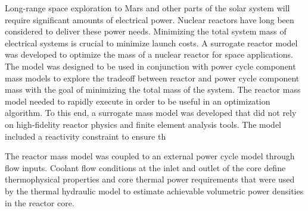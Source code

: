 Long-range space exploration to Mars and other parts of the solar system will
require significant amounts of electrical power. Nuclear reactors have long been
considered to deliver these power needs. Minimizing the total system mass of
electrical systems is crucial to minimize launch costs. A surrogate reactor
model was developed to optimize the mass of a nuclear reactor for space
applications. The model was designed to be used in conjunction with power cycle
component mass models to explore the tradeoff between reactor and power cycle
component mass with the goal of minimizing the total mass of the system. The
reactor mass model needed to rapidly execute in order to be useful in an
optimization algorithm. To this end, a surrogate mass model was developed that
did not rely on high-fidelity reactor physics and finite element analysis tools.
The model included a reactivity constraint to ensure th

The reactor mass model was coupled to an external power cycle model through flow
inputs. Coolant flow conditions at the inlet and outlet of the core define
thermophysical properties and core thermal power requirements that were used by
the thermal hydraulic model to estimate achievable volumetric power densities in
the reactor core.


